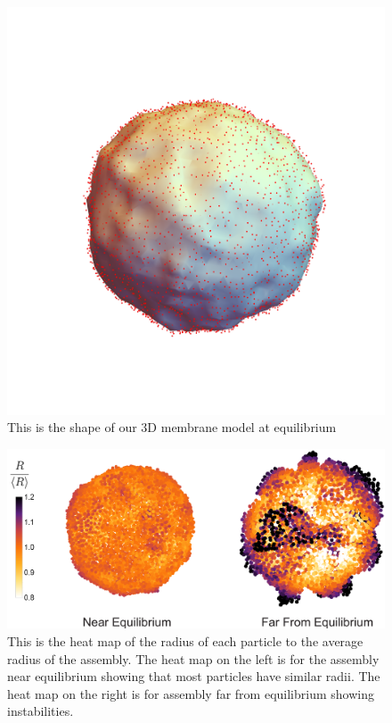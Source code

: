 \documentclass[amsmath,preprintnumbers,10pt,nofootinbib,prl,twocolumn]{revtex4-1}
\begin{document}
\begin{figure}
\includegraphics[width=1\linewidth,angle=0]{3DMembraneShape.pdf}
\caption{ This is the shape of our 3D membrane model at equilibrium }
\label{fig:3Dmembranesurface}
\end{figure}
\begin{figure}
\includegraphics[width=1\linewidth,angle=0]{3DMembraneRelativeRadius.pdf}
\caption{ This is the heat map of the radius of each particle to the average radius of the assembly. The heat map on the left is for the assembly near equilibrium showing that most particles have similar radii. The heat map on the right is for assembly far from equilibrium showing instabilities.  }
\label{fig:relativeradius3D}
\end{figure}
\end{document}

